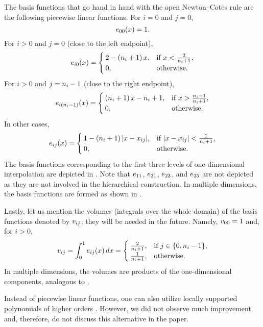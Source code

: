 The basis functions that go hand in hand with the open Newton--Cotes rule are
the following piecewise linear functions. For $i = 0$ and $j = 0$,
\[
  e_{00}(x) = 1.
\]
For $i > 0$ and $j = 0$ (close to the left endpoint),
\[
  e_{i0}(x) = \begin{cases}
    2 - \left( n_i + 1 \right) x, & \text{if } x < \frac{2}{n_i + 1}, \\
    0, & \text{otherwise}.
  \end{cases}
\]
For $i > 0$ and $j = n_i - 1$ (close to the right endpoint),
\[
  e_{i(n_i - 1)}(x) = \begin{cases}
    \left( n_i + 1 \right) x - n_i + 1, & \text{if } x > \frac{n_i - 1}{n_i + 1}, \\
    0, & \text{otherwise}.
  \end{cases}
\]
In other cases,
\[
  e_{ij}(x) = \begin{cases}
    1 - \left( n_i + 1 \right)|x - x_{ij}|, & \text{if } |x - x_{ij}| < \frac{1}{n_i + 1}, \\
    0, & \text{otherwise}.
  \end{cases}
\]
The basis functions corresponding to the first three levels of one-dimensional
interpolation are depicted in . Note that $e_{11}$, $e_{21}$,
$e_{23}$, and $e_{25}$ are not depicted as they are not involved in the
hierarchical construction. In multiple dimensions, the basis functions are
formed as shown in .


Lastly, let us mention the volumes (integrals over the whole domain) of the
basis functions denoted by $v_{ij}$; they will be needed in the future. Namely,
$v_{00} = 1$ and, for $i > 0$,
\begin{equation} \elab{volume}
  \w_{ij} = \int_0^1 \e_{ij}(\x) \, \d\x = \begin{cases}
    \frac{2}{\n_i + 1}, & \text{if } j \in \{ 0, \n_i - 1 \}, \\
    \frac{1}{\n_i + 1}, & \text{otherwise}.
  \end{cases}
\end{equation}
In multiple dimensions, the volumes are products of the one-dimensional
components, analogous to .

\begin{remark}
Instead of piecewise linear functions, one can also utilize locally supported
polynomials of higher orders \cite{jakeman2012}. However, we did not observe
much improvement and, therefore, do not discuss this alternative in the paper.
\end{remark}
